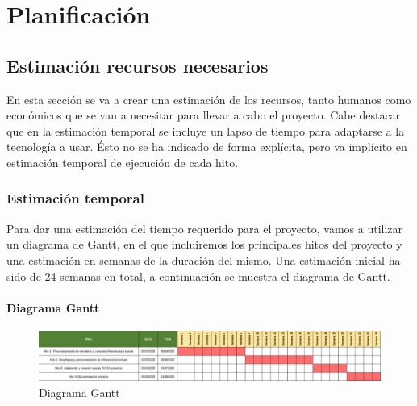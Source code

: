 \chapter {Planificación}

\section{Estimación recursos necesarios}
\begin{paragraph}
	En esta sección se va a crear una estimación de los recursos, tanto humanos como económicos que se van a necesitar para llevar a cabo el proyecto. Cabe destacar que en la estimación temporal se incluye un lapso de tiempo para adaptarse a la tecnología a usar. Ésto no se ha indicado de forma explícita, pero va implícito en estimación temporal de ejecución de cada hito. \\ 
	
\end{paragraph}
\subsection{Estimación temporal}
\begin{paragraph}
	Para dar una estimación del tiempo requerido para el proyecto, vamos a utilizar un diagrama de Gantt, en el que incluiremos los principales hitos del proyecto y una estimación en semanas de la duración del mismo. Una estimación inicial ha sido de 24 semanas en total, a continuación se muestra el diagrama de Gantt.
\end{paragraph}

\newpage
\subsubsection{Diagrama Gantt}
	\begin{figure}[!hbt]
		\centering
		\includegraphics[scale=0.4,angle=-90]{imagenes/Planificacion/gantt.jpg}
		\caption[Diagrama Gantt]{Diagrama Gantt \cite{Gantt:online}} 
		\label{Diagrama Gannt}
	\end{figure}
\clearpage
